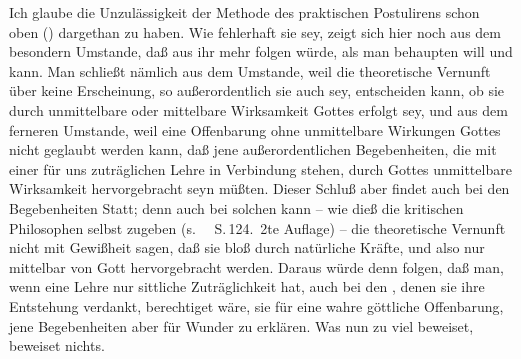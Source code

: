    Ich glaube die Unzulässigkeit der Methode des praktischen Postulirens schon oben () dargethan zu haben. Wie fehlerhaft sie sey, zeigt sich hier noch aus dem besondern Umstande, daß aus ihr mehr folgen würde, als man behaupten will und kann. Man schließt nämlich aus dem Umstande, weil die theoretische Vernunft über keine Erscheinung, so außerordentlich sie auch sey, entscheiden kann, ob sie durch unmittelbare oder mittelbare Wirksamkeit Gottes erfolgt sey, und aus dem ferneren Umstande, weil eine Offenbarung ohne unmittelbare Wirkungen Gottes nicht geglaubt werden kann, daß jene außerordentlichen Begebenheiten, die mit einer für uns zuträglichen Lehre in Verbindung stehen, durch Gottes unmittelbare Wirksamkeit hervorgebracht seyn müßten. Dieser Schluß aber findet auch bei den  Begebenheiten Statt; denn auch bei solchen kann -- wie dieß die kritischen Philosophen selbst zugeben (s.~\zB\  S.\,124.\ 2te Auflage) -- die theoretische Vernunft nicht mit Gewißheit sagen, daß sie bloß durch natürliche Kräfte, und also nur mittelbar von Gott hervorgebracht werden. Daraus würde denn folgen, daß man, wenn eine Lehre nur sittliche Zuträglichkeit hat, auch bei den , denen sie ihre Entstehung verdankt, berechtiget wäre, sie für eine wahre göttliche Offenbarung, jene Begebenheiten aber für Wunder zu erklären. Was nun zu viel beweiset, beweiset nichts.~


